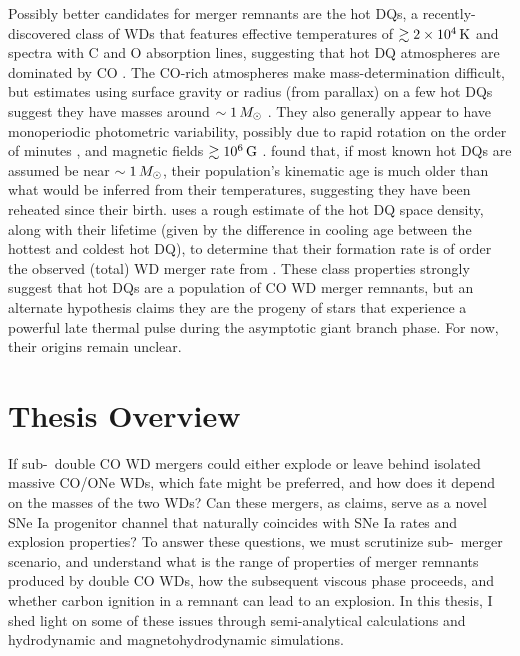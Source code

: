 Possibly better candidates for merger remnants are the hot DQs, a recently-discovered class of WDs that features effective temperatures of $\gtrsim2\times10^4\,\mathrm{K}$ and spectra with C and O absorption lines, suggesting that hot DQ atmospheres are dominated by CO \citep{dufo+07, dufo+08}.  The CO-rich atmospheres make mass-determination difficult, but estimates using surface gravity or radius (from parallax) on a few hot DQs suggest they have masses around $\sim1\,\Msun$ \citep{dufo+11, dunl15thesis}.  They also generally appear to have monoperiodic photometric variability, possibly due to rapid rotation on the order of minutes \citep{lawr+13, will+16}, and magnetic fields $\gtrsim10^6\,\mathrm{G}$ \citep{dufo+13}.  \cite{dunlc15} found that, if most known hot DQs are assumed be near $\sim1\,\Msun$, their population's kinematic age is much older than what would be inferred from their temperatures, suggesting they have been reheated since their birth.  \cite{dunl15thesis} uses a rough estimate of the hot DQ space density, along with their lifetime (given by the difference in cooling age between the hottest and coldest hot DQ), to determine that their formation rate is of order the observed (total) WD merger rate from \cite{badem12}.  These class properties strongly suggest that hot DQs are a population of CO WD merger remnants, but an alternate hypothesis \citep{dufo+07, alth+09} claims they are the progeny of stars that experience a powerful late thermal pulse during the asymptotic giant branch phase.  For now, their origins remain unclear.


\section{Thesis Overview}


If sub-\Mch\ double CO WD mergers could either explode or leave behind isolated massive CO/ONe WDs, which fate might be preferred, and how does it depend on the masses of the two WDs?  Can these mergers, as \citeal{vkercj10} claims, serve as a novel SNe Ia progenitor channel that naturally coincides with SNe Ia rates and explosion properties?  To answer these questions, we must scrutinize \citeal{vkercj10} sub-\Mch\ merger scenario, and understand what is the range of properties of merger remnants produced by double CO WDs, how the subsequent viscous phase proceeds, and whether carbon ignition in a remnant can lead to an explosion.  In this thesis, I shed light on some of these issues through semi-analytical calculations and hydrodynamic and magnetohydrodynamic simulations.

